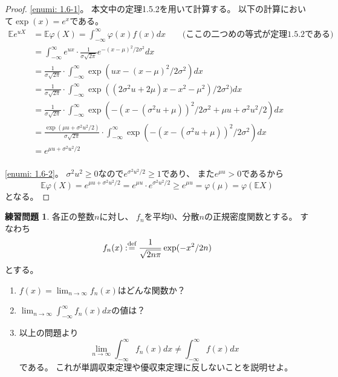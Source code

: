 \documentclass[uplatex]{jsarticle}
\theoremstyle{definition}
\newtheorem{prob}[prob]{練習問題}
\def\E{\mathbb{E}}
\def\dfn{:\overset{\mbox{{\scriptsize def}}}{=}}
\begin{document}
\begin{proof}
  \ref{enumi: 1.6-1}。
  本文中の定理1.5.2を用いて計算する。
  以下の計算において\(\exp(x)=e^x\)である。
  \begin{align*}
    \E e^{uX} &= \E \varphi(X) = \int_{-\infty}^{\infty}\varphi(x)f(x)dx
     \ \ \ \ \ \ \ \ \ \text{(ここの二つめの等式が定理1.5.2である)} \\
    &= \int_{-\infty}^{\infty}e^{ux}\cdot
    \frac{1}{\sigma\sqrt{2\pi}}e^{-(x-\mu)^2/2\sigma^2}dx \\
    &= \frac{1}{\sigma\sqrt{2\pi}}\cdot
    \int_{-\infty}^{\infty}\exp(ux-(x-\mu)^2/2\sigma^2)dx \\
    &= \frac{1}{\sigma\sqrt{2\pi}}\cdot
    \int_{-\infty}^{\infty}\exp((2\sigma^2u+2\mu)x-x^2-\mu^2)/2\sigma^2)dx  \\
    &= \frac{1}{\sigma\sqrt{2\pi}}\cdot
    \int_{-\infty}^{\infty}\exp(-(x-(\sigma^2u+\mu))^2/2\sigma^2+\mu u+\sigma^2u^2/2)dx  \\
    &= \frac{\exp(\mu u+\sigma^2u^2/2)}{\sigma\sqrt{2\pi}}\cdot
    \int_{-\infty}^{\infty}\exp(-(x-(\sigma^2u+\mu))^2/2\sigma^2)dx  \\
    &= e^{\mu u+\sigma^2u^2/2} \\
  \end{align*}

  \ref{enumi: 1.6-2}。
  \(\sigma^2u^2 \geq 0\)なので\(e^{\sigma^2u^2/2} \geq 1\)であり、
  また\(e^{\mu u} > 0\)であるから
  \[
  \E \varphi(X) = e^{\mu u+\sigma^2u^2/2} = e^{\mu u}\cdot e^{\sigma^2u^2/2}
  \geq e^{\mu u} = \varphi(\mu) = \varphi(\E X)
  \]
  となる。
\end{proof}





\begin{prob}\label{prob: 1.7}
  各正の整数\(n\)に対し、
  \(f_n\)を平均\(0\)、分散\(n\)の正規密度関数とする。
  すなわち
  \[
  f_n(x) \dfn \frac{1}{\sqrt{2n\pi}}\exp(-x^2/2n)
  \]
  とする。
  \begin{enumerate}
    \item \label{enumi: 1.7-1}
    \(f(x)=\lim_{n\to \infty}f_n(x)\)はどんな関数か？
    \item \label{enumi: 1.7-2}
    \(\lim_{n\to \infty}\int_{-\infty}^\infty f_n(x)dx\)の値は？
    \item \label{enumi: 1.7-3}
    以上の問題より
    \[
    \lim_{n\to \infty}\int_{-\infty}^\infty f_n(x)dx
    \neq \int_{-\infty}^\infty f(x)dx
    \]
    である。
    これが単調収束定理や優収束定理に反しないことを説明せよ。
  \end{enumerate}
\end{prob}
\end{document}
